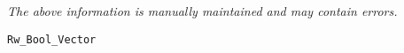 \label{pkg:rw\_bool\_vector}

{\tiny \it The above information is manually maintained and may contain errors.}
\begin{verbatim}
Rw_Bool_Vector
\end{verbatim}
